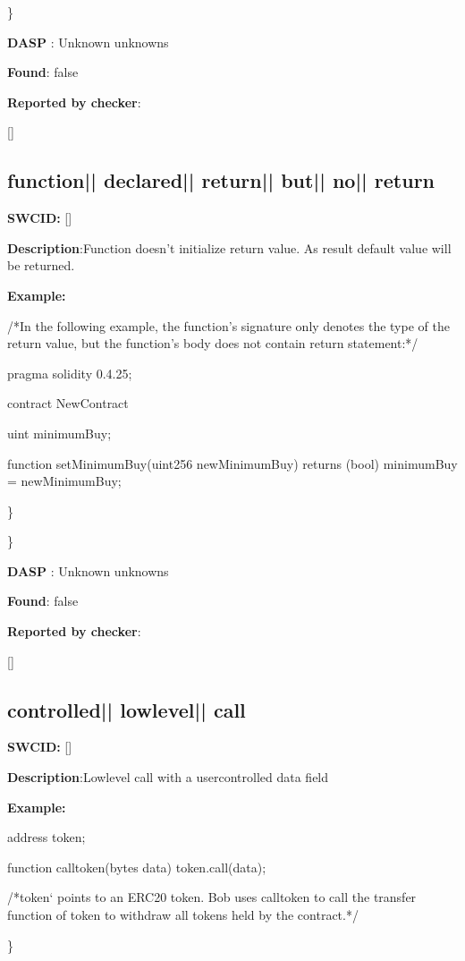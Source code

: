 \documentclass{article}
\begin{document}
\} 

\textbf{DASP} : Unknown unknowns

\textbf{Found}: false

\textbf{Reported by checker}: 
\begin{ffcode} 

[]
\end{ffcode} 
\subsection{function{|\textunderscore| }declared{|\textunderscore| }return{|\textunderscore| }but{|\textunderscore| }no{|\textunderscore| }return} 
\textbf{SWC{\textunderscore }ID:} []

\textbf{Description}:Function doesn't initialize return value. As result default value will be returned.


\textbf{Example:} 
\begin{ffcode} 

/*In the following example, the function's signature only denotes the type of the return value, but the function's body does not contain return statement:*/ 

pragma solidity 0.4.25;

contract NewContract {
    uint minimumBuy;

    function setMinimumBuy(uint256 newMinimumBuy) returns (bool){
        minimumBuy = newMinimumBuy;
    }
}

\end{ffcode} 
\} 

\} 

\textbf{DASP} : Unknown unknowns

\textbf{Found}: false

\textbf{Reported by checker}: 
\begin{ffcode} 

[]
\end{ffcode} 
\subsection{controlled{|\textunderscore| }lowlevel{|\textunderscore| }call} 
\textbf{SWC{\textunderscore }ID:} []

\textbf{Description}:Low{\textendash}level call with a user{\textendash}controlled data field


\textbf{Example:} 
\begin{ffcode} 

address token;

function call\textunderscore token(bytes data){
  token.call(data);
}

 /*token` points to an ERC20 token. Bob uses call\textunderscore token to call the transfer function of token to withdraw all tokens held by the contract.*/ 

\end{ffcode} 
\} 
\end{document}
